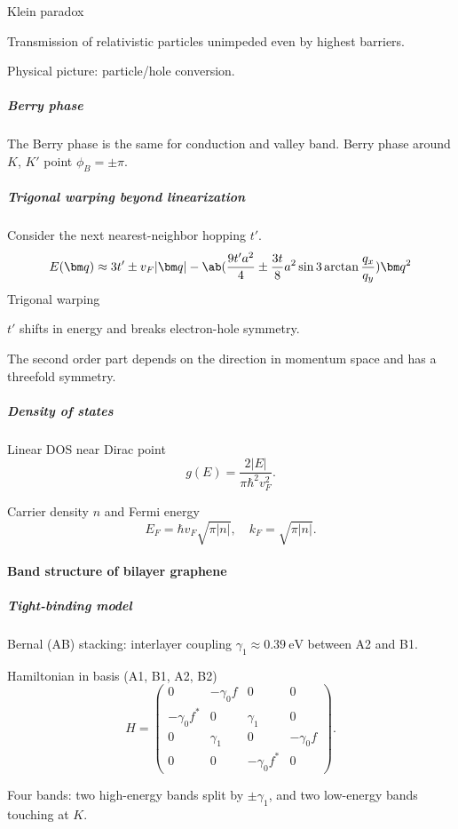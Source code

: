 Klein paradox
\begin{enumext}
  \item Transmission of relativistic particles unimpeded even by
  highest barriers.
  \item Physical picture: particle/hole conversion.
\end{enumext}

\subparagraph{Berry phase}

The Berry phase is the same for conduction and valley band.
Berry phase around $K$, $K'$ point $\phi_B = \pm\pi$.

\subparagraph{Trigonal warping beyond linearization}\leavevmode

Consider the next nearest-neighbor hopping $t'$.
\[
  E(\bm q) \approx 3t' \pm v_F|\bm q|
- \ab(\frac{9t'a^2}{4} \pm \frac{3t}{8}a^2\sin3\arctan\frac{q_x}{q_y})\bm q^2
\]
Trigonal warping
\begin{enumext}
  \item $t'$ shifts in energy and breaks electron-hole symmetry.
  \item The second order part depends on the direction in momentum space and
  has a threefold symmetry.
\end{enumext}

\subparagraph{Density of states}

\begin{enumext}
  \item Linear DOS near Dirac point
  \[
    g(E) = \frac{2|E|}{\pi \hbar^2 v_F^2}.
  \]
  \item Carrier density $n$ and Fermi energy
  \[
    E_F = \hbar v_F \sqrt{\pi |n|}, \quad k_F = \sqrt{\pi |n|}.
  \]
\end{enumext}

\paragraph{Band structure of bilayer graphene}

\subparagraph{Tight-binding model}

\begin{enumext}
  \item Bernal (AB) stacking: interlayer
  coupling $\gamma_1 \approx \qty{0.39}\eV$ between A2 and B1.
  \item Hamiltonian in basis (A1, B1, A2, B2)
  \[
    H = \begin{pmatrix}
      0 & -\gamma_0 f & 0 & 0\\
      -\gamma_0 f^* & 0 & \gamma_1 & 0\\
      0 & \gamma_1 & 0 & -\gamma_0 f\\
      0 & 0 & -\gamma_0 f^* & 0
    \end{pmatrix}.
  \]
  \item Four bands: two high-energy bands split by $\pm\gamma_1$, and two
  low-energy bands touching at $K$.
\end{enumext}

